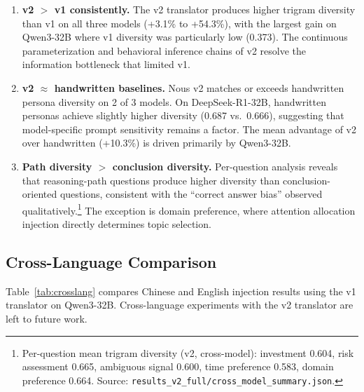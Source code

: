 \documentclass[11pt]{article}
\begin{document}
\begin{enumerate}[leftmargin=*,itemsep=2pt]
    \item \textbf{v2 $>$ v1 consistently.} The v2 translator produces higher trigram diversity than v1 on all three models (+3.1\% to +54.3\%), with the largest gain on Qwen3-32B where v1 diversity was particularly low (0.373). The continuous parameterization and behavioral inference chains of v2 resolve the information bottleneck that limited v1.
    \item \textbf{v2 $\approx$ handwritten baselines.} Nous v2 matches or exceeds handwritten persona diversity on 2 of 3 models. On DeepSeek-R1-32B, handwritten personas achieve slightly higher diversity (0.687 vs.\ 0.666), suggesting that model-specific prompt sensitivity remains a factor. The mean advantage of v2 over handwritten (+10.3\%) is driven primarily by Qwen3-32B.
    \item \textbf{Path diversity $>$ conclusion diversity.} Per-question analysis reveals that reasoning-path questions produce higher diversity than conclusion-oriented questions, consistent with the ``correct answer bias'' observed qualitatively.\footnote{Per-question mean trigram diversity (v2, cross-model): investment 0.604, risk assessment 0.665, ambiguous signal 0.600, time preference 0.583, domain preference 0.664. Source: \texttt{results\_v2\_full/cross\_model\_summary.json}.} The exception is domain preference, where attention allocation injection directly determines topic selection.
\end{enumerate}

\subsection{Cross-Language Comparison}

Table~\ref{tab:crosslang} compares Chinese and English injection results using the v1 translator on Qwen3-32B. Cross-language experiments with the v2 translator are left to future work.
\end{document}
